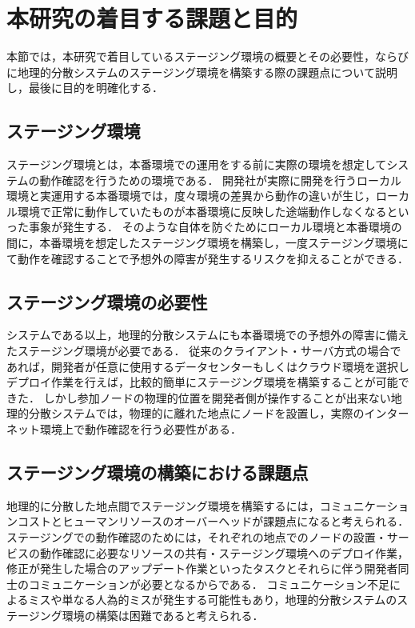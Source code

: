 \section{本研究の着目する課題と目的}
\label{introduction:issue-and-aim}
本節では，本研究で着目しているステージング環境の概要とその必要性，ならびに地理的分散システムのステージング環境を構築する際の課題点について説明し，最後に目的を明確化する．

\subsection{ステージング環境}
ステージング環境とは，本番環境での運用をする前に実際の環境を想定してシステムの動作確認を行うための環境である．
開発社が実際に開発を行うローカル環境と実運用する本番環境では，度々環境の差異から動作の違いが生じ，ローカル環境で正常に動作していたものが本番環境に反映した途端動作しなくなるといった事象が発生する．
そのような自体を防ぐためにローカル環境と本番環境の間に，本番環境を想定したステージング環境を構築し，一度ステージング環境にて動作を確認することで予想外の障害が発生するリスクを抑えることができる．

\subsection{ステージング環境の必要性}
システムである以上，地理的分散システムにも本番環境での予想外の障害に備えたステージング環境が必要である．
従来のクライアント・サーバ方式の場合であれば，開発者が任意に使用するデータセンターもしくはクラウド環境を選択しデプロイ作業を行えば，比較的簡単にステージング環境を構築することが可能できた．
しかし参加ノードの物理的位置を開発者側が操作することが出来ない地理的分散システムでは，物理的に離れた地点にノードを設置し，実際のインターネット環境上で動作確認を行う必要性がある．

\subsection{ステージング環境の構築における課題点}
地理的に分散した地点間でステージング環境を構築するには，コミュニケーションコストとヒューマンリソースのオーバーヘッドが課題点になると考えられる．
ステージングでの動作確認のためには，それぞれの地点でのノードの設置・サービスの動作確認に必要なリソースの共有・ステージング環境へのデプロイ作業，修正が発生した場合のアップデート作業といったタスクとそれらに伴う開発者同士のコミュニケーションが必要となるからである．
コミュニケーション不足によるミスや単なる人為的ミスが発生する可能性もあり，地理的分散システムのステージング環境の構築は困難であると考えられる．

